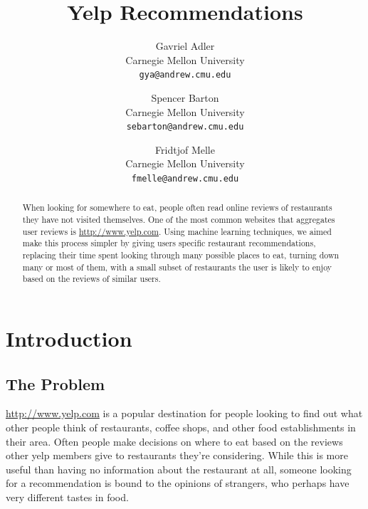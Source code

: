 \documentclass[10pt,twocolumn,letterpaper]{article}
\begin{document}
\title{Yelp Recommendations}

\author{
Gavriel Adler\\
Carnegie Mellon University\\
{\tt\small gya@andrew.cmu.edu}
\and
Spencer Barton\\
Carnegie Mellon University\\
{\tt\small sebarton@andrew.cmu.edu}
\and
Fridtjof Melle\\
Carnegie Mellon University\\
{\tt\small fmelle@andrew.cmu.edu}
}

\maketitle

\begin{abstract}
   When looking for somewhere to eat, people often read online reviews of restaurants they have not visited themselves. One of the most common websites that aggregates user reviews is \url{http://www.yelp.com}. Using machine learning techniques, we aimed make this process simpler by giving users specific restaurant recommendations, replacing their time spent looking through many possible places to eat, turning down many or most of them, with a small subset of restaurants the user is likely to enjoy based on the reviews of similar users.

   
\end{abstract}

\section{Introduction}

\subsection{The Problem}
\url{http://www.yelp.com} is a popular destination for people looking to find out what other people think of restaurants, coffee shops, and other food establishments in their area. Often people make decisions on where to eat based on the reviews other yelp members give to restaurants they're considering. While this is more useful than having no information about the restaurant at all, someone looking for a recommendation is bound to the opinions of strangers, who perhaps have very different tastes in food. 
\end{document}
